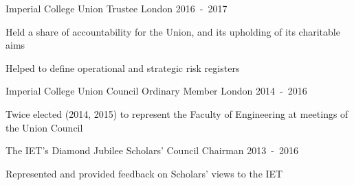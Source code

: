 \begin{cventries}

\cventry
  {Imperial College Union}
  {Trustee}
  {London}
  {2016~-~2017}
  {\begin{cvitems}
    \item {Held a share of accountability for the Union, and its upholding of its charitable aims}
    \item {Helped to define operational and strategic risk registers}
  \end{cvitems}}

\cventry
  {Imperial College Union Council}
  {Ordinary Member}
  {London}
  {2014~-~2016}
  {\begin{cvitems}
    \item {Twice elected (2014, 2015) to represent the Faculty of Engineering at meetings of the Union Council}
   \end{cvitems}}

\cventry
  {The IET's Diamond Jubilee Scholars' Council}
  {Chairman}
  {}
  {2013~-~2016}
  {\begin{cvitems}
    \item {Represented and provided feedback on Scholars' views to the IET}
  \end{cvitems}}
\end{cventries}
